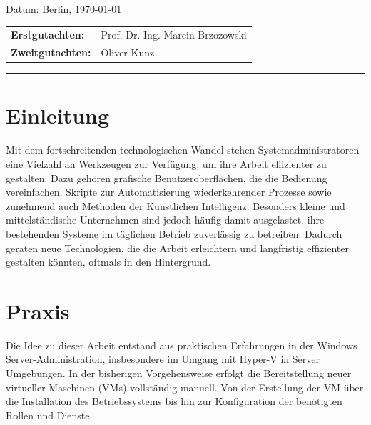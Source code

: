 \documentclass[a4paper,12pt]{article}
\begin{document}
\begin{titlepage}
    \begin{center}
        {\normalsize Datum: Berlin, \today}
    \end{center}


\begin{center}
    \begin{tabular}{ll}
        {\bfseries\normalsize Erstgutachten:} & Prof. Dr.-Ing. Marcin Brzozowski \\
        {\bfseries\normalsize Zweitgutachten:} & Oliver Kunz \\
    \end{tabular}
\end{center}


    \textcolor{HTW}{\rule{\linewidth}{0.4mm}}

\end{titlepage}


\newpage

\tableofcontents

\newpage

\section{Einleitung}

Mit dem fortschreitenden technologischen Wandel stehen Systemadministratoren eine Vielzahl an Werkzeugen zur Verfügung, um ihre Arbeit effizienter zu gestalten. Dazu gehören grafische Benutzeroberflächen, die die Bedienung vereinfachen, Skripte zur Automatisierung wiederkehrender Prozesse sowie zunehmend auch Methoden der Künstlichen Intelligenz.
Besonders kleine und mittelständische Unternehmen sind jedoch häufig damit ausgelastet, ihre bestehenden Systeme im täglichen Betrieb zuverlässig zu betreiben. Dadurch geraten neue Technologien, die die Arbeit erleichtern und langfristig effizienter gestalten könnten, oftmals in den Hintergrund.\\

\section{Praxis}

Die Idee zu dieser Arbeit entstand aus praktischen Erfahrungen in der Windows Server-Administration, insbesondere im Umgang mit Hyper-V in Server Umgebungen. 
In der bisherigen Vorgehensweise erfolgt die Bereitstellung neuer virtueller Maschinen (VMs) vollständig manuell. Von der Erstellung der VM über die Installation des Betriebssystems bis hin zur Konfiguration der benötigten Rollen und Dienste.\\
\end{document}
